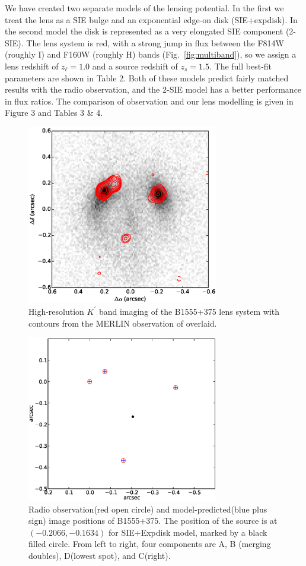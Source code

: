 \documentclass[useAMS,usenatbib]{mn2e}
\begin{document}
We have created two separate models of the lensing potential.  In the
first we treat the lens as a SIE bulge and an exponential edge-on disk
(SIE+expdisk).  In the second model the disk is represented as a very
elongated SIE component (2-SIE).  The lens system is red, with a
strong jump in flux between the F814W (roughly I) and F160W (roughly
H) bands (Fig.~\ref{fig:multiband}), so we assign a lens redshift of
$z_\ell = 1.0$ and a source redshift of $z_s =1.5$.  The full best-fit parameters are shown in Table
2. Both of these models predict fairly matched results with the radio
observation, and the 2-SIE model has a better performance in flux
ratios. The comparison of observation and our lens modelling is given
in Figure 3 and Tables 3 \& 4.

\begin{figure}
\includegraphics[width=84mm]{1555_ao_merlin_overlay.eps}
\caption{High-resolution  $K^\prime$ band imaging of the B1555+375 lens system 
with contours from the MERLIN observation of \citet{Marlow} overlaid.
%
\label{fig:merlin}}
\end{figure}


\begin{figure}
\includegraphics[width=84mm]{point_source.eps}
\caption{Radio observation(red open circle) and model-predicted(blue plus sign) image positions of B1555+375. The position of the source is at $(-0.2066,-0.1634)$ for SIE+Expdisk model, marked by a black filled circle. From left to right, four components are A, B (merging doubles), D(lowest spot), and C(right).\label{fig2}}
\end{figure}
\end{document}
